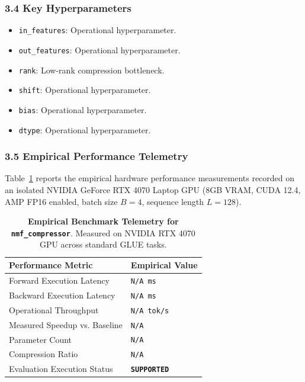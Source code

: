 \subsubsection*{3.4 Key Hyperparameters}
\begin{itemize}
    \item \texttt{in\_features}: Operational hyperparameter.
    \item \texttt{out\_features}: Operational hyperparameter.
    \item \texttt{rank}: Low-rank compression bottleneck.
    \item \texttt{shift}: Operational hyperparameter.
    \item \texttt{bias}: Operational hyperparameter.
    \item \texttt{dtype}: Operational hyperparameter.
\end{itemize}

\subsubsection*{3.5 Empirical Performance Telemetry}
Table~\ref{tab:telemetry_nmf_compressor} reports the empirical hardware performance measurements recorded on an isolated NVIDIA GeForce RTX 4070 Laptop GPU (8GB VRAM, CUDA 12.4, AMP FP16 enabled, batch size $B=4$, sequence length $L=128$).

\begin{table}[h]
\centering
\small
\caption{\textbf{Empirical Benchmark Telemetry for \texttt{nmf\_compressor}}. Measured on NVIDIA RTX 4070 GPU across standard GLUE tasks.}
\label{tab:telemetry_nmf_compressor}
\begin{tabularx}{\columnwidth}{lX}
\toprule
\textbf{Performance Metric} & \textbf{Empirical Value} \\
\midrule
Forward Execution Latency & \texttt{N/A ms} \\
Backward Execution Latency & \texttt{N/A ms} \\
Operational Throughput & \texttt{N/A tok/s} \\
Measured Speedup vs. Baseline & \texttt{N/A} \\
Parameter Count & \texttt{N/A} \\
Compression Ratio & \texttt{N/A} \\
Evaluation Execution Status & \textbf{\texttt{SUPPORTED}} \\
\bottomrule
\end{tabularx}
\end{table}

